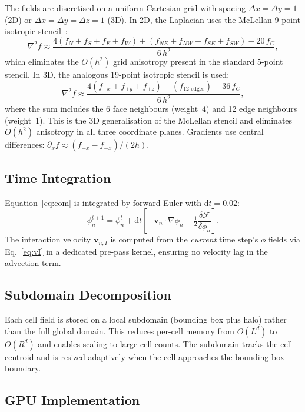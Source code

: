 \documentclass[11pt]{article}
\newcommand{\vnI}{\mathbf{v}_{n,I}}
\newcommand{\phin}{\phi_n}
\begin{document}
The fields are discretised on a uniform Cartesian grid with spacing $\Delta x = \Delta y = 1$ (2D) or $\Delta x = \Delta y = \Delta z = 1$ (3D).  In 2D, the Laplacian uses the McLellan 9-point isotropic stencil~\cite{McLellan1973}:
\begin{equation}
\nabla^2 f \approx \frac{4(f_N + f_S + f_E + f_W) + (f_{NE}+f_{NW}+f_{SE}+f_{SW}) - 20\,f_C}{6\,h^2},
\end{equation}
which eliminates the $O(h^2)$ grid anisotropy present in the standard 5-point stencil.  In 3D, the analogous 19-point isotropic stencil is used:
\begin{equation}
\nabla^2 f \approx \frac{4(f_{\pm x}+f_{\pm y}+f_{\pm z}) + (f_{\text{12 edges}}) - 36\,f_C}{6\,h^2},
\end{equation}
where the sum includes the 6 face neighbours (weight~4) and 12 edge neighbours (weight~1).  This is the 3D generalisation of the McLellan stencil and eliminates $O(h^2)$ anisotropy in all three coordinate planes.
Gradients use central differences: $\partial_x f \approx (f_{+x}-f_{-x})/(2h)$.

\subsection{Time Integration}

Equation~\eqref{eq:eom} is integrated by forward Euler with $\mathrm{d}t = 0.02$:
\begin{equation}
\phin^{t+1} = \phin^t + \mathrm{d}t\left[-\mathbf{v}_n\cdot\nabla\phin - \tfrac{1}{2}\frac{\delta\mathcal{F}}{\delta\phin}\right].
\end{equation}
The interaction velocity $\vnI$ is computed from the \emph{current} time step's $\phi$ fields via Eq.~\eqref{eq:vI} in a dedicated pre-pass kernel, ensuring no velocity lag in the advection term.

\subsection{Subdomain Decomposition}

Each cell field is stored on a local subdomain (bounding box plus halo) rather than the full global domain.  This reduces per-cell memory from $O(L^d)$ to $O(R^d)$ and enables scaling to large cell counts.  The subdomain tracks the cell centroid and is resized adaptively when the cell approaches the bounding box boundary.

\subsection{GPU Implementation}
\end{document}
